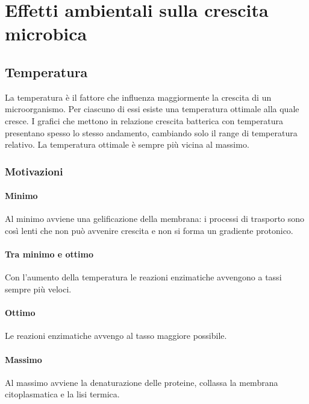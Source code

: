 \section{Effetti ambientali sulla crescita microbica}

	\subsection{Temperatura}
	La temperatura \`e il fattore che influenza maggiormente la crescita di un microorganismo.
	Per ciascuno di essi esiste una temperatura ottimale alla quale cresce.
	I grafici che mettono in relazione crescita batterica con temperatura presentano spesso lo stesso andamento, cambiando solo il range di temperatura relativo.
	La temperatura ottimale \`e sempre pi\`u vicina al massimo.

		\subsubsection{Motivazioni}
			
			\paragraph{Minimo}
			Al minimo avviene una gelificazione della membrana: i processi di trasporto sono cos\`i lenti che non pu\`o avvenire crescita e non si forma un gradiente protonico.

			\paragraph{Tra minimo e ottimo}
			Con l'aumento della temperatura le reazioni enzimatiche avvengono a tassi sempre pi\`u veloci.

			\paragraph{Ottimo}
			Le reazioni enzimatiche avvengo al tasso maggiore possibile.

			\paragraph{Massimo}
			Al massimo avviene la denaturazione delle proteine, collassa la membrana citoplasmatica e la lisi termica.

